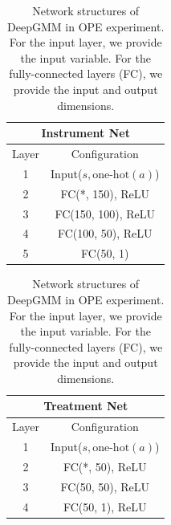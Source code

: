 \begingroup
\renewcommand{\arraystretch}{1.2}
\begin{table}[t]
    \caption{Network structures of DeepGMM in OPE experiment. For the input layer, we provide the input variable. For the fully-connected layers (FC), we provide the input and output dimensions.}
    
    \label{deepGMM-ope}
    
    \begin{minipage}{0.48\hsize}
        \centering
        \begin{tabular}{cc}
            \multicolumn{2}{c}{\textbf{Instrument Net}}
            \\ \hline
            Layer & Configuration \\ \hline
            1 & Input($s,\text{one-hot}(a)$) \\ \hline
            2 & FC(*, 150), ReLU\\ \hline
            3 & FC(150, 100), ReLU\\ \hline
            4 & FC(100, 50), ReLU \\ \hline
            5 & FC(50, 1) \\ \hline
            \end{tabular}    
    \end{minipage}
    \hfill
    \begin{minipage}{0.48\hsize}
        \centering
        \begin{tabular}{cc}
            \multicolumn{2}{c}{\textbf{Treatment Net}} 
            \\ \hline
            Layer & Configuration \\ \hline
            1 & Input($s, \text{one-hot}(a)$) \\ \hline
            2 & FC(*, 50), ReLU\\ \hline
            3 & FC(50, 50), ReLU\\ \hline
            4 & FC(50, 1), ReLU\\ \hline
            \end{tabular}    
    \end{minipage}
\end{table}
\endgroup  

